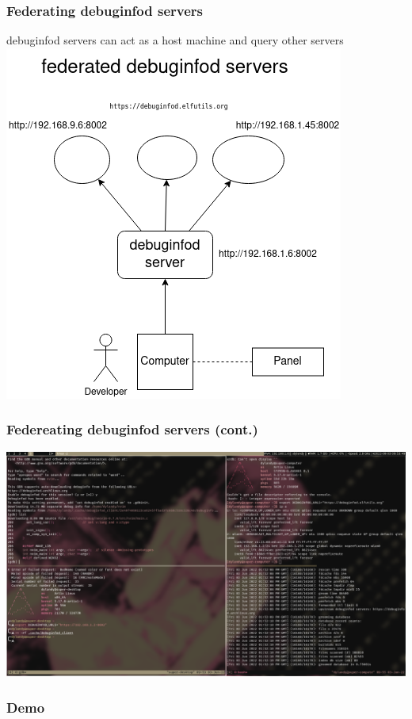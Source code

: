 \documentclass[12pt]{beamer}
\begin{document}
\begin{frame}[fragile]
   \frametitle{ Federating debuginfod servers}
   debuginfod servers can act as a host machine and query other servers
   \includegraphics[scale=0.45]{federeated_servers.png}
\end{frame}

\begin{frame}
   \frametitle{ Federeating debuginfod servers (cont.) }
   \includegraphics[scale=.1775]{federated_ss.png}
\end{frame}

\begin{frame}
   \frametitle{ Demo}
\end{frame}
\end{document}

